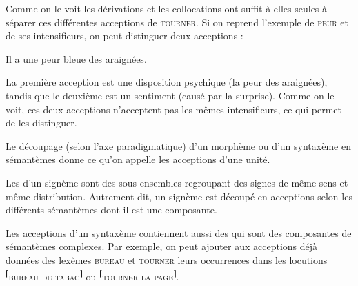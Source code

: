 Comme on le voit les dérivations et les collocations ont suffit à elles seules à séparer ces différentes acceptions de \textsc{tourner}. Si on reprend l’exemple de \textsc{peur} et de ses intensifieurs, on peut distinguer deux acceptions :

\ea
    {Il a une peur bleue des araignées.}
\z
{}
\z
{}
\z
{}
\z

La première acception est une disposition psychique (la peur des araignées), tandis que le deuxième est un sentiment (causé par la surprise). Comme on le voit, ces deux acceptions n’acceptent pas les mêmes intensifieurs, ce qui permet de les distinguer.

Le découpage (selon l’axe paradigmatique) d’un morphème ou d’un syntaxème en sémantèmes donne ce qu’on appelle les acceptions d’une unité.

\begin{styleLivreImportant}
Les  d’un signème sont des sous-ensembles regroupant des signes de même sens et même distribution. Autrement dit, un signème est découpé en acceptions selon les différents sémantèmes dont il est une composante.
\end{styleLivreImportant}

Les acceptions d’un syntaxème contiennent aussi des  qui sont des composantes de sémantèmes complexes. Par exemple, on peut ajouter aux acceptions déjà données des lexèmes \textsc{bureau} et \textsc{tourner} leurs occurrences dans les locutions \textsuperscript{⌈}\textsc{bureau} \textsc{de} \textsc{tabac}\textsuperscript{⌉} ou \textsuperscript{⌈}\textsc{tourner} \textsc{la} \textsc{page}\textsuperscript{⌉}.

